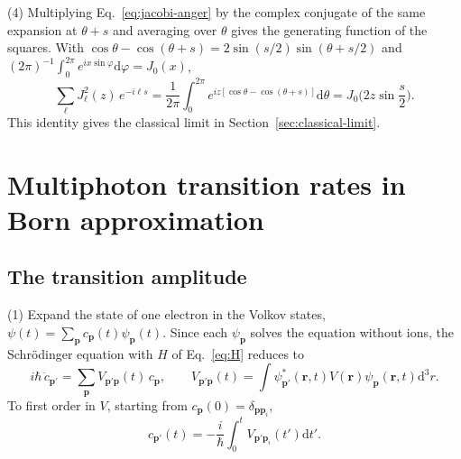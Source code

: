 \documentclass[11pt]{article}
\numberwithin{equation}{section}
\newcommand{\pv}{\mathbf p}
\newcommand{\rv}{\mathbf r}
\newcommand{\dd}{\mathrm d}
\begin{document}
{\noindent}(4) Multiplying Eq.~\eqref{eq:jacobi-anger} by the complex conjugate
of the same expansion at $\theta+s$ and averaging over $\theta$ gives the
generating function of the squares. With
$\cos\theta-\cos(\theta+s)=2\sin(s/2)\sin(\theta+s/2)$ and
$(2\pi)^{-1}\int_0^{2\pi}e^{ix\sin\varphi}\dd\varphi=J_0(x)$,
\begin{equation}
\boxed{\;\sum_\ell J_\ell^2(z)\,e^{-i\ell s}=\frac{1}{2\pi}\int_0^{2\pi}e^{iz[\cos\theta-\cos(\theta+s)]}\dd\theta
=J_0\Big(2z\sin\frac s2\Big).\;}
\label{eq:bessel-genfun}
\end{equation}
This identity gives the classical limit in Section~\ref{sec:classical-limit}.


\section{Multiphoton transition rates in Born approximation}
\label{sec:rates}
\subsection{The transition amplitude}
{\noindent}(1) Expand the state of one electron in the Volkov states,
$\psi(t)=\sum_{\pv}c_{\pv}(t)\psi_{\pv}(t)$. Since each $\psi_{\pv}$ solves the
equation without ions, the Schr\"odinger equation with $H$ of
Eq.~\eqref{eq:H} reduces to
\begin{equation}
i\hbar\,\dot c_{\pv'}=\sum_{\pv}V_{\pv'\pv}(t)\,c_{\pv},\qquad
V_{\pv'\pv}(t)=\int\psi^*_{\pv'}(\rv,t)V(\rv)\psi_{\pv}(\rv,t)\dd^3r.
\label{eq:cdot}
\end{equation}
To first order in $V$, starting from $c_{\pv}(0)=\delta_{\pv\pv_i}$,
\begin{equation}
c_{\pv'}(t)=-\frac{i}{\hbar}\int_0^t V_{\pv'\pv_i}(t')\dd t'.
\label{eq:c1}
\end{equation}
\end{document}
